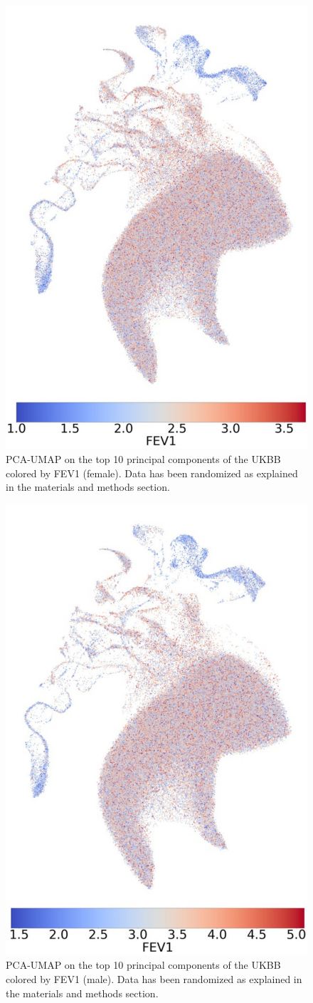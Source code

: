 \documentclass[12pt]{pnas-new}
\begin{document}
\begin{figure}
    \centering
    \includegraphics[width=0.4\columnwidth]{images/UKBB_UMAP_PC10_NN15_MD05_2018328174511_201871416305_3063_0_0_pct1_f.pdf}
    \caption{PCA-UMAP on the top 10 principal components of the UKBB colored by FEV1 (female). Data has been randomized as explained in the materials and methods section.}
    \label{fig:supp_ukbb_fev_f}
\end{figure}

\begin{figure}
    \centering
    \includegraphics[width=0.4\columnwidth]{images/UKBB_UMAP_PC10_NN15_MD05_2018328174511_201871416305_3063_0_0_pct1_m.pdf}
    \caption{PCA-UMAP on the top 10 principal components of the UKBB colored by FEV1 (male). Data has been randomized as explained in the materials and methods section.}
    \label{fig:supp_ukbb_fev_m}
\end{figure}
\end{document}
